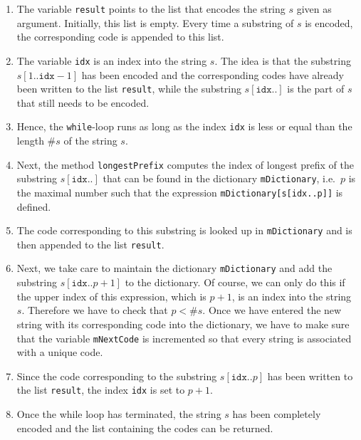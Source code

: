 \begin{enumerate}
\item The variable \texttt{result} points to the list that encodes the string $s$ given as argument.
      Initially, this list is empty.  Every time a substring of $s$ is encoded, the corresponding code
      is appended to this list.
\item The variable \texttt{idx} is an index into the string $s$.  The idea is that the substring
      $s[1..\mathtt{idx}-1]$ has been encoded and the corresponding codes have already been written
      to the list \texttt{result}, while the substring $s[\mathtt{idx}..]$ is
      the part of $s$ that still needs to be encoded.
\item Hence, the \texttt{while}-loop runs as long as the index \texttt{idx} is less or equal than
      the length $\texttt{\#}s$ of the string $s$.
\item Next, the method \texttt{longestPrefix}  computes the index of longest prefix of the substring
      $s[\mathtt{idx}..]$ that can be found in the dictionary \texttt{mDictionary}, i.e.~$p$ is the
      maximal number such that the expression \texttt{mDictionary[s[idx..p]]} is defined.
\item The code corresponding to this substring is looked up in \texttt{mDictionary}
      and is then appended to the list \texttt{result}.
\item Next, we take care to maintain the dictionary \texttt{mDictionary} and add the substring
      $s[\mathtt{idx}..p+1]$ to the dictionary.  Of course, we can only do this if the upper index
      of this expression, which is $p+1$, is an index into the string $s$. 
      Therefore we have to check that $p < \mathtt{\#}s$.
      Once we have entered the
      new string with its corresponding code into the dictionary, we have to make sure that the
      variable \texttt{mNextCode} is incremented so that every string is associated with a unique
      code.  
\item Since the code corresponding to the substring $s[\mathtt{idx}..p]$ has been written to the
      list \texttt{result}, the index \texttt{idx} is set to $p+1$.
\item Once the while loop has terminated, the string $s$ has been completely encoded and the list
      containing the codes can be returned.
\end{enumerate}


